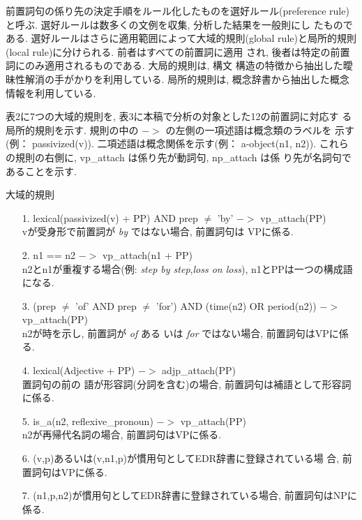 前置詞句の係り先の決定手順をルール化したものを選好ルール(preference
rule)と呼ぶ. 選好ルールは数多くの文例を収集, 分析した結果を一般則にし
たものである. 選好ルールはさらに適用範囲によって大域的規則(global
rule)と局所的規則(local rule)に分けられる. 前者はすべての前置詞に適用
され, 後者は特定の前置詞にのみ適用されるものである. 大局的規則は, 構文
構造の特徴から抽出した曖昧性解消の手がかりを利用している. 局所的規則は, 
概念辞書から抽出した概念情報を利用している. 

表2に7つの大域的規則を, 表3に本稿で分析の対象とした12の前置詞に対応す
る局所的規則を示す. 規則の中の $->$ の左側の一項述語は概念類のラベルを
示す(例： passivized(v)). 二項述語は概念関係を示す(例： a-object(n1,
n2)). これらの規則の右側に, vp\_attach は係り先が動詞句, np\_attach は係
り先が名詞句であることを示す. 

\newpage

\begin{table}[htb]
\caption{大域的規則}
{\normalsize
\begin{center}
\begin{itemize}
\item[1.] lexical(passivized(v) + PP) AND prep $\neq$ 'by' $->$
vp\_attach(PP)\\ vが受身形で前置詞が {\it by} ではない場合, 前置詞句は
VPに係る. 
\item[2.] n1 == n2 $->$ vp\_attach(n1 + PP)\\ n2とn1が重複する場合(例:
{\it step by step},{\it loss on loss}), n1とPPは一つの構成語になる. 
\item[3.] (prep $\neq$ 'of' AND prep $\neq$ 'for') AND (time(n2) OR
period(n2)) $->$ vp\_attach(PP)\\ n2が時を示し, 前置詞が {\it of} ある
いは {\it for} ではない場合, 前置詞句はVPに係る. 
\item[4.] lexical(Adjective + PP) $->$ adjp\_attach(PP)\\ 置詞句の前の
語が形容詞(分詞を含む)の場合, 前置詞句は補語として形容詞に係る. 
\item[5.] is\_a(n2, reflexive\_pronoun) $->$ vp\_attach(PP)\\ n2が再帰代名詞の場合, 前置詞句はVPに係る. 
\item[6.] (v,p)あるいは(v,n1,p)が慣用句としてEDR辞書に登録されている場
合, 前置詞句はVPに係る. 
\item[7.] (n1,p,n2)が慣用句としてEDR辞書に登録されている場合, 前置詞句はNPに係る. 
\end{itemize}
\end{center}
}
\end{table}

